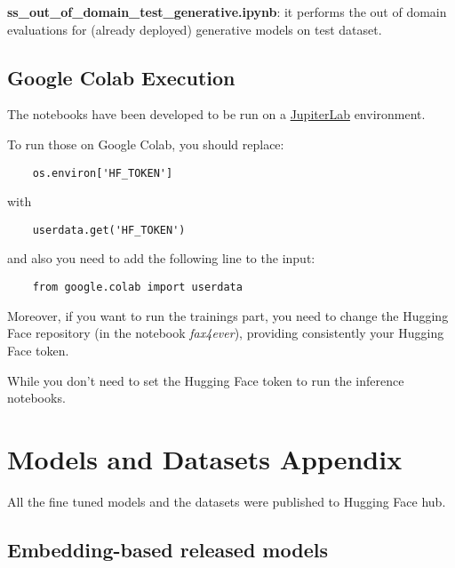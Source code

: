 \documentclass[11pt]{article}
\begin{document}
\noindent \textbf{ss\_out\_of\_domain\_test\_generative.ipynb}: it performs the out of domain evaluations for (already deployed) generative models on test dataset.

\subsection{Google Colab Execution}

The notebooks have been developed to be run on a \href{https://jupyterlab.readthedocs.io/en/latest/#}{JupiterLab}
environment. 

To run those on Google Colab, you should replace:

\begin{verbatim}
	os.environ['HF_TOKEN']
\end{verbatim}

with

\begin{verbatim}
	userdata.get('HF_TOKEN')
\end{verbatim}

and also you need to add the following line to the input:

\begin{verbatim}
	from google.colab import userdata
\end{verbatim}

Moreover, if you want to run the trainings part, you need to change 
the Hugging Face repository (in the notebook \emph{fax4ever}),
providing consistently your Hugging Face token.

While you don't need to set the Hugging Face token to
run the inference notebooks.

\section{Models and Datasets Appendix}
\label{sec:appendix2}

All the fine tuned models and the datasets were published to Hugging Face 
hub.

\subsection{Embedding-based released models}
\end{document}
